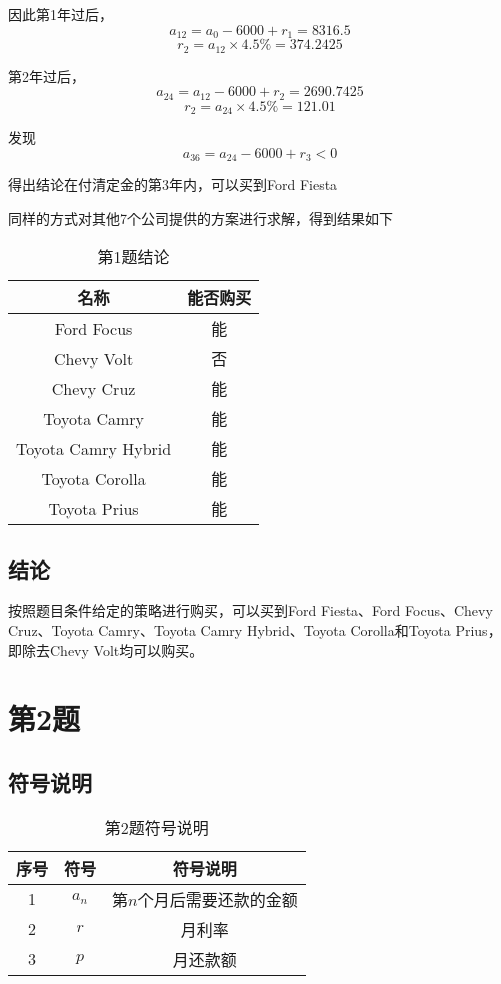 \documentclass{article}
\begin{document}
因此第1年过后，
\[a_12 = a_0 - 6000 + r_1 = 8316.5\]
\[r_2 = a_12 \times 4.5\% = 374.2425\]

第2年过后，
\[a_24 = a_12 - 6000 + r_2 = 2690.7425\]
\[r_2 = a_24 \times 4.5\% = 121.01\]

发现
\[a_36 = a_24 - 6000 + r_3 < 0\]

得出结论在付清定金的第3年内，可以买到Ford Fiesta

同样的方式对其他7个公司提供的方案进行求解，得到结果如下
\begin{table}[!h]
\begin{center}
\begin{tabular}{|c|c|}
    \hline
    名称 & 能否购买\\
    \hline
    Ford Focus & 能 \\
    \hline
    Chevy Volt & 否 \\ 
    \hline
    Chevy Cruz & 能 \\ 
    \hline
    Toyota Camry & 能 \\ 
    \hline
    Toyota Camry Hybrid & 能\\ 
    \hline
    Toyota Corolla & 能 \\ 
    \hline
    Toyota Prius & 能 \\ 
    \hline
\end{tabular}
\caption{\label{demo-table}第1题结论}
\end{center}
\end{table}

\subsection{结论}
按照题目条件给定的策略进行购买，可以买到Ford Fiesta、Ford Focus、Chevy Cruz、Toyota Camry、Toyota Camry Hybrid、Toyota Corolla和Toyota Prius，即除去Chevy Volt均可以购买。


\section{第2题}

\subsection{符号说明}

\begin{table}[!h]
\begin{center}
\begin{tabular}{|c|c|c|}
    \hline
    序号 & 符号 & 符号说明\\
    \hline
    1 & $a_n$ & 第$n$个月后需要还款的金额\\
    \hline
    2 & $r$ & 月利率\\ 
    \hline
    3 & $p$ & 月还款额\\  
    \hline
\end{tabular}
\caption{\label{demo-table}第2题符号说明}
\end{center}
\end{table}
\end{document}
